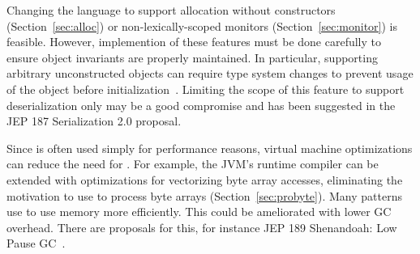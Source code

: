 Changing the language to support allocation without constructors
(Section~\ref{sec:alloc}) or non-lexically-scoped monitors
(Section~\ref{sec:monitor}) is feasible. However, implemention of these
features must be done carefully to ensure object invariants
are properly maintained. In particular, supporting arbitrary unconstructed
objects can require type system changes to prevent usage of the object 
before initialization~\cite{Qi:2009:MTS:1480881.1480890}. Limiting the scope
of this feature to support deserialization only may be a good compromise and
has been suggested in the JEP 187 Serialization 2.0 proposal.

Since \unsafe{} is often used simply for performance reasons, virtual machine
optimizations can reduce the need for \unsafe{}.
For example, 
the JVM's runtime compiler can be extended with optimizations for vectorizing
byte array accesses, eliminating the motivation to use \unsafe{} to process byte
arrays (Section~\ref{sec:probyte}).
Many patterns use \unsafe{} to use memory more efficiently.
This could be ameliorated with lower GC overhead. There are proposals for
this, for instance JEP 189 Shenandoah: Low Pause GC~\cite{jep189}.





